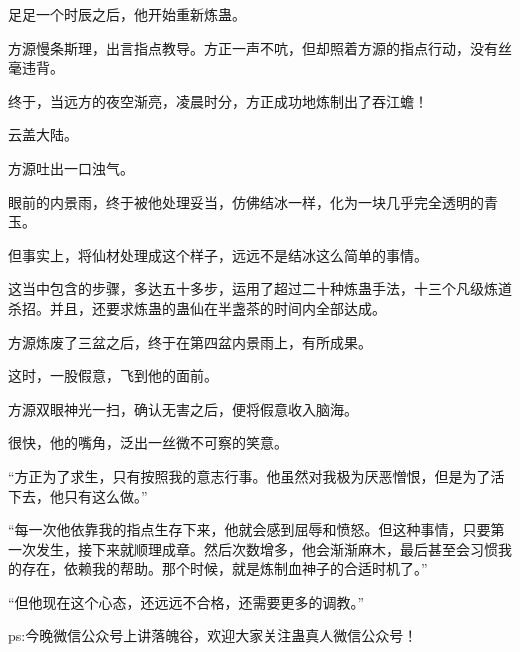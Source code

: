 \begin{this_body}
足足一个时辰之后，他开始重新炼蛊。

方源慢条斯理，出言指点教导。方正一声不吭，但却照着方源的指点行动，没有丝毫违背。

终于，当远方的夜空渐亮，凌晨时分，方正成功地炼制出了吞江蟾！

云盖大陆。

方源吐出一口浊气。

眼前的内景雨，终于被他处理妥当，仿佛结冰一样，化为一块几乎完全透明的青玉。

但事实上，将仙材处理成这个样子，远远不是结冰这么简单的事情。

这当中包含的步骤，多达五十多步，运用了超过二十种炼蛊手法，十三个凡级炼道杀招。并且，还要求炼蛊的蛊仙在半盏茶的时间内全部达成。

方源炼废了三盆之后，终于在第四盆内景雨上，有所成果。

这时，一股假意，飞到他的面前。

方源双眼神光一扫，确认无害之后，便将假意收入脑海。

很快，他的嘴角，泛出一丝微不可察的笑意。

“方正为了求生，只有按照我的意志行事。他虽然对我极为厌恶憎恨，但是为了活下去，他只有这么做。”

“每一次他依靠我的指点生存下来，他就会感到屈辱和愤怒。但这种事情，只要第一次发生，接下来就顺理成章。然后次数增多，他会渐渐麻木，最后甚至会习惯我的存在，依赖我的帮助。那个时候，就是炼制血神子的合适时机了。”

“但他现在这个心态，还远远不合格，还需要更多的调教。”

ps:今晚微信公众号上讲落魄谷，欢迎大家关注蛊真人微信公众号！

\end{this_body}

